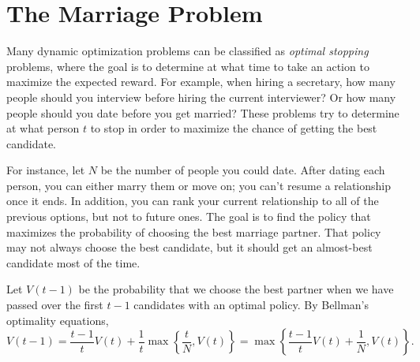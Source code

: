 
\section*{The Marriage Problem} %

Many dynamic optimization problems can be classified as \emph{optimal stopping} problems, where the goal is to determine at what time to take an action to maximize the expected reward.
For example, when hiring a secretary, how many people should you interview before hiring the current interviewer?
Or how many people should you date before you get married?
These problems try to determine at what person $t$ to stop in order to maximize the chance of getting the best candidate.

For instance, let $N$ be the number of people you could date.
After dating each person, you can either marry them or move on; you can't resume a relationship once it ends.
In addition, you can rank your current relationship to all of the previous options, but not to future ones.
The goal is to find the policy that maximizes the probability of choosing the best marriage partner.
That policy may not always choose the best candidate, but it should get an almost-best candidate most of the time.

Let $V(t-1)$ be the probability that we choose the best partner when we have passed over the first $t-1$ candidates with an optimal policy.
By Bellman's optimality equations,
\begin{equation}
\label{eq:dynamicopt-do7}
V(t-1) = \frac{t-1}{t}V(t)+\frac{1}{t}\max\left\{ \frac{t}{N},V(t)\right\} = \max\left\{\frac{t-1}{t}V(t)+\frac{1}{N},V(t)\right\}.
\end{equation}

